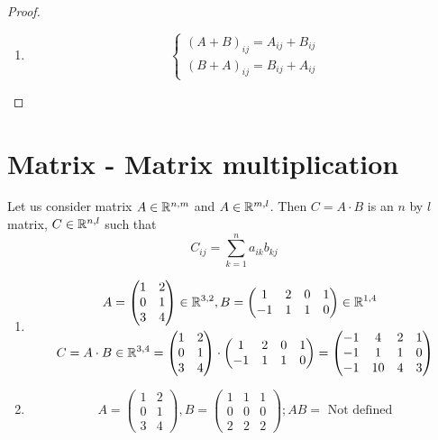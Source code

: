 \begin{proof}
\begin{enumerate}
\item \[
\begin{cases}
\left( A+B \right)_{ij} = A_{ij}+B_{ij}\\
\left( B+A \right)_{ij} = B_{ij}+A_{ij}
\end{cases}
\]

\end{enumerate}
\end{proof}

\section{Matrix - Matrix multiplication}
\begin{definition}
Let us consider matrix $A\in\mathbb{R}^{n,m}$ and $A\in\mathbb{R}^{m,l}$. Then $C = A\cdot B$ is an $n$ by $l$ matrix, $C\in\mathbb{R}^{n,l}$ such that 
\[
C_{ij} = \sum\limits^{n}_{k=1}a_{ik}b_{kj}
\]
\end{definition}
\begin{example}
\begin{enumerate}
\item \begin{align*}
A&= \begin{pmatrix}
1 & 2\\
0 & 1\\
3 & 4
\end{pmatrix}\in\mathbb{R}^{3,2}, B = \begin{pmatrix}
1 & 2 & 0 & 1\\
-1 & 1 & 1 & 0
\end{pmatrix}\in\mathbb{R}^{1,4}\\
C = A\cdot B&\in\mathbb{R}^{3,4}= \begin{pmatrix}
1 & 2\\
0 & 1\\
3 & 4
\end{pmatrix}\cdot \begin{pmatrix}
1 & 2 & 0 & 1\\
-1 & 1 & 1 & 0
\end{pmatrix} = \begin{pmatrix}
-1 & 4 & 2 & 1\\
-1 & 1 & 1 & 0\\
-1 & 10 & 4 & 3
\end{pmatrix}
\end{align*}
\item 
\[
A = \begin{pmatrix}
1 & 2 \\ 
0 & 1\\
3 & 4
\end{pmatrix}, B = \begin{pmatrix}
1 & 1 & 1\\
0 & 0 & 0\\
2 & 2 & 2
\end{pmatrix}; AB = \text{ Not defined}
\]
\end{enumerate}
\end{example}

